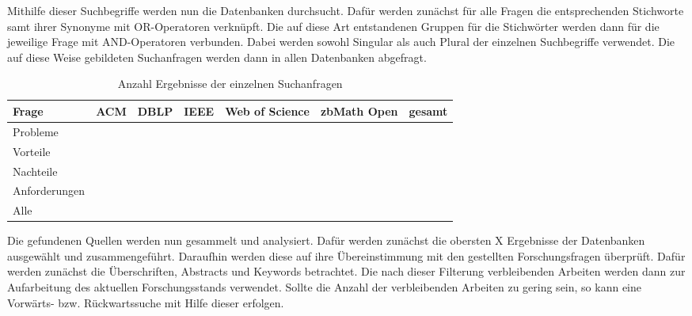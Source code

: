 Mithilfe dieser Suchbegriffe werden nun die Datenbanken durchsucht. Dafür werden zunächst für alle Fragen die entsprechenden Stichworte samt ihrer Synonyme mit OR-Operatoren verknüpft. Die auf diese Art entstandenen Gruppen für die Stichwörter werden dann für die jeweilige Frage mit AND-Operatoren verbunden. Dabei werden sowohl Singular als auch Plural der einzelnen Suchbegriffe verwendet. Die auf diese Weise gebildeten Suchanfragen werden dann in allen Datenbanken abgefragt.

\begin{table}[htbp]
    \centering
    \begin{tabular}{|l|c|c|c|c|c|c|}
        \hline
        Frage         & ACM & DBLP & IEEE & Web of Science & zbMath Open & gesamt \\
        \hline
        Probleme      &     &      &      &                &             &        \\
        \hline
        Vorteile      &     &      &      &                &             &        \\
        \hline
        Nachteile     &     &      &      &                &             &        \\
        \hline
        Anforderungen &     &      &      &                &             &        \\
        \hline
        Alle          &     &      &      &                &             &        \\
        \hline
    \end{tabular}
    \caption{Anzahl Ergebnisse der einzelnen Suchanfragen}
    \label{table:amount-search-results}
\end{table}

Die gefundenen Quellen werden nun gesammelt und analysiert. Dafür werden zunächst die obersten X Ergebnisse der Datenbanken ausgewählt und zusammengeführt. Daraufhin werden diese auf ihre Übereinstimmung mit den gestellten Forschungsfragen überprüft. Dafür werden zunächst die Überschriften, Abstracts und Keywords betrachtet. Die nach dieser Filterung verbleibenden Arbeiten werden dann zur Aufarbeitung des aktuellen Forschungsstands verwendet. Sollte die Anzahl der verbleibenden Arbeiten zu gering sein, so kann eine Vorwärts- bzw. Rückwartssuche mit Hilfe dieser erfolgen.